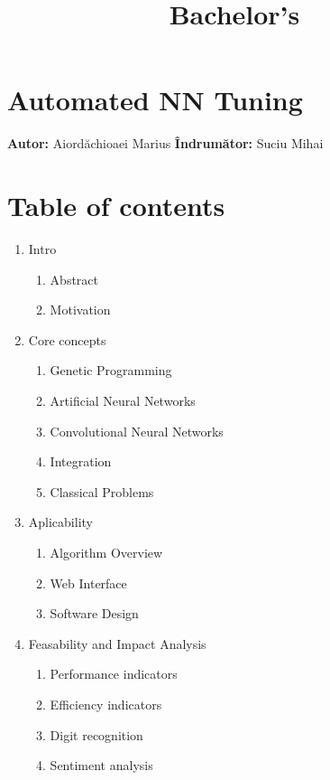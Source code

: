 \documentclass[11pt]{article}
\title{Bachelor's}
\begin{document}
    
    
    \maketitle
    
    

    
    \hypertarget{automated-nn-tuning}{%
\section{Automated NN Tuning}\label{automated-nn-tuning}}

\textbf{Autor: }Aiordăchioaei Marius \textbar{} \textbf{Îndrumător:
}Suciu Mihai

    \hypertarget{table-of-contents}{%
\section{Table of contents}\label{table-of-contents}}

\begin{enumerate}
\def\labelenumi{\arabic{enumi}.}
\item
  Intro

  \begin{enumerate}
  \def\labelenumii{\arabic{enumii}.}
  \item
    Abstract
  \item
    Motivation
  \end{enumerate}
\item
  Core concepts

  \begin{enumerate}
  \def\labelenumii{\arabic{enumii}.}
  \setcounter{enumii}{2}
  \item
    Genetic Programming
  \item
    Artificial Neural Networks
  \item
    Convolutional Neural Networks
  \item
    Integration
  \item
    Classical Problems
  \end{enumerate}
\item
  Aplicability

  \begin{enumerate}
  \def\labelenumii{\arabic{enumii}.}
  \setcounter{enumii}{7}
  \item
    Algorithm Overview
  \item
    Web Interface
  \item
    Software Design
  \end{enumerate}
\item
  Feasability and Impact Analysis

  \begin{enumerate}
  \def\labelenumii{\arabic{enumii}.}
  \setcounter{enumii}{10}
  \item
    Performance indicators
  \item
    Efficiency indicators
  \item
    Digit recognition
  \item
    Sentiment analysis
  \end{enumerate}
\end{enumerate}
\end{document}
